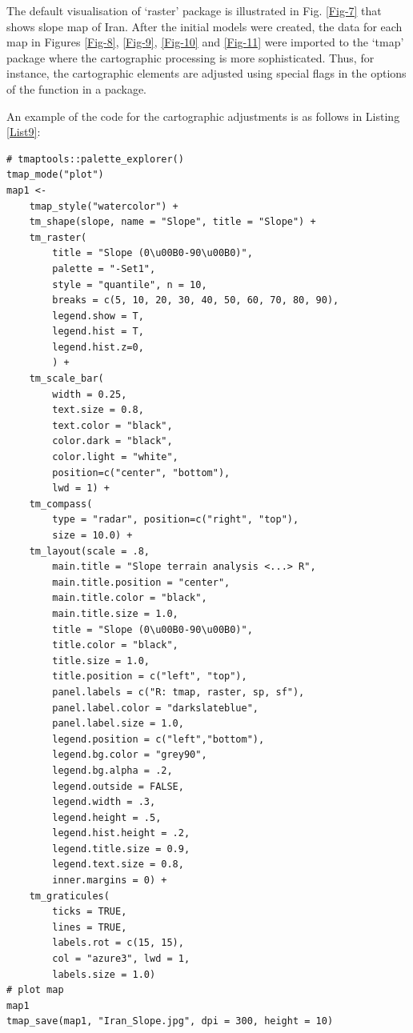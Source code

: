 \documentclass[12pt,a4paper,oneside]{article}
\begin{document}
The default visualisation of ‘raster’ package is illustrated in Fig. \ref{Fig-7} that  shows slope map of Iran. After the initial models were created, the data for each map in Figures \ref{Fig-8}, \ref{Fig-9}, \ref{Fig-10} and \ref{Fig-11} were imported to the ‘tmap’ package where the cartographic processing is more sophisticated. Thus, for instance, the cartographic elements are adjusted using special flags in the options of the function in a package. 

An example of the code for the cartographic adjustments is as follows in Listing \ref{List9}: 
\begin{lstlisting}[frame=single]
# tmaptools::palette_explorer()
tmap_mode("plot")
map1 <-
    tmap_style("watercolor") +
    tm_shape(slope, name = "Slope", title = "Slope") +
    tm_raster(
        title = "Slope (0\u00B0-90\u00B0)",
        palette = "-Set1",
        style = "quantile", n = 10,
        breaks = c(5, 10, 20, 30, 40, 50, 60, 70, 80, 90),
        legend.show = T,
        legend.hist = T,
        legend.hist.z=0,
        ) +
    tm_scale_bar(
        width = 0.25,
        text.size = 0.8,
        text.color = "black",
        color.dark = "black",
        color.light = "white",
        position=c("center", "bottom"),
        lwd = 1) +
    tm_compass(
        type = "radar", position=c("right", "top"), 
        size = 10.0) +
    tm_layout(scale = .8,
        main.title = "Slope terrain analysis <...> R",
        main.title.position = "center",
        main.title.color = "black",
        main.title.size = 1.0,
        title = "Slope (0\u00B0-90\u00B0)",
        title.color = "black",
        title.size = 1.0,
        title.position = c("left", "top"),
        panel.labels = c("R: tmap, raster, sp, sf"),
        panel.label.color = "darkslateblue",
        panel.label.size = 1.0,
        legend.position = c("left","bottom"),
        legend.bg.color = "grey90",
        legend.bg.alpha = .2,
        legend.outside = FALSE,
        legend.width = .3,
        legend.height = .5,
        legend.hist.height = .2,
        legend.title.size = 0.9,
        legend.text.size = 0.8,
        inner.margins = 0) +
    tm_graticules(
        ticks = TRUE,
        lines = TRUE,
        labels.rot = c(15, 15),
        col = "azure3", lwd = 1,
        labels.size = 1.0)
# plot map
map1
tmap_save(map1, "Iran_Slope.jpg", dpi = 300, height = 10)
\end{lstlisting}
\end{document}
